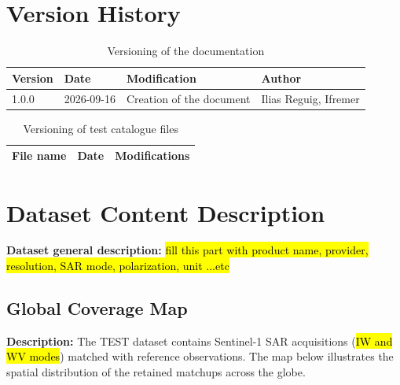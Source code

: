 \documentclass[11pt,a4paper]{article}
\begin{document}
%    

\section*{Version History}

\begin{table}[H]
    \centering
    \caption{Versioning of the documentation}
    \label{tab:versioning_documentation}
    \begin{tabular}{@{}p{2cm}p{3cm}p{8cm}p{4cm}@{}}
        \toprule
        \textbf{Version} & \textbf{Date} & \textbf{Modification} & \textbf{Author} \\
        \midrule
        1.0.0 & 2026-09-16 & Creation of the document & Ilias Reguig, Ifremer \\
        \bottomrule
    \end{tabular}
\end{table}

\begin{table}[H]
    \centering
    \caption{Versioning of test catalogue files}
    \label{tab:versioning_catalogue_files}
    \begin{tabular}{@{}p{6.6cm}p{2.4cm}p{8cm}@{}}
        \toprule
        \textbf{File name} & \textbf{Date} & \textbf{Modifications} \\
        \midrule
        \bottomrule
    \end{tabular}
\end{table}

\newpage


\section{Dataset Content Description}

\textbf{Dataset general description:} \hl{fill this part with product name, provider, resolution, SAR mode, polarization, unit ...etc}

\subsection{Global Coverage Map}
\textbf{Description:} The TEST dataset contains Sentinel-1 SAR acquisitions (\hl{IW and WV modes}) matched with reference observations. The map below illustrates the spatial distribution of the retained matchups across the globe.
\end{document}
